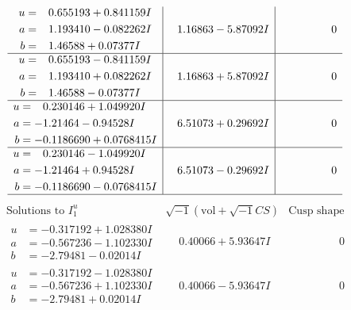 \documentclass[1p]{elsarticle_modified}
\theoremstyle{definition}
\newcommand{\I}{\sqrt{-1}}
\begin{document}
$$\begin{array}{c|c|c}
\begin{aligned}
u &= \phantom{-}0.655193 + 0.841159 I \\
a &= \phantom{-}1.193410 - 0.082262 I \\
b &= \phantom{-}1.46588 + 0.07377 I\end{aligned}
 & \phantom{-}1.16863 - 5.87092 I & \phantom{-0.000000 } 0 \\ \hline\begin{aligned}
u &= \phantom{-}0.655193 - 0.841159 I \\
a &= \phantom{-}1.193410 + 0.082262 I \\
b &= \phantom{-}1.46588 - 0.07377 I\end{aligned}
 & \phantom{-}1.16863 + 5.87092 I & \phantom{-0.000000 } 0 \\ \hline\begin{aligned}
u &= \phantom{-}0.230146 + 1.049920 I \\
a &= -1.21464 - 0.94528 I \\
b &= -0.1186690 + 0.0768415 I\end{aligned}
 & \phantom{-}6.51073 + 0.29692 I & \phantom{-0.000000 } 0 \\ \hline\begin{aligned}
u &= \phantom{-}0.230146 - 1.049920 I \\
a &= -1.21464 + 0.94528 I \\
b &= -0.1186690 - 0.0768415 I\end{aligned}
 & \phantom{-}6.51073 - 0.29692 I & \phantom{-0.000000 } 0\\
 \hline 
 \end{array}$$\newpage$$\begin{array}{c|c|c}  
\text{Solutions to }I^u_{1}& \I (\text{vol} + \sqrt{-1}CS) & \text{Cusp shape}\\
 \hline 
\begin{aligned}
u &= -0.317192 + 1.028380 I \\
a &= -0.567236 - 1.102330 I \\
b &= -2.79481 - 0.02014 I\end{aligned}
 & \phantom{-}0.40066 + 5.93647 I & \phantom{-0.000000 } 0 \\ \hline\begin{aligned}
u &= -0.317192 - 1.028380 I \\
a &= -0.567236 + 1.102330 I \\
b &= -2.79481 + 0.02014 I\end{aligned}
 & \phantom{-}0.40066 - 5.93647 I & \phantom{-0.000000 } 0 \\ \hline\begin{aligned}

\end{aligned}
\end{array}$$
\end{document}
